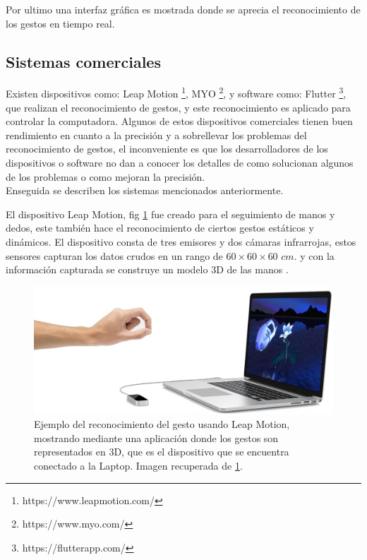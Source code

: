 Por ultimo una interfaz gráfica es mostrada donde se aprecia el reconocimiento de los gestos en tiempo real.  


 
\subsection{Sistemas comerciales}

Existen dispositivos como: Leap Motion \footnote{\label{LeapMotionFN} https://www.leapmotion.com/}, MYO \footnote{\label{MyoFN} https://www.myo.com/}, y software como: Flutter \footnote{\label{FlutterFN} https://flutterapp.com/}, que realizan el reconocimiento de gestos, y este reconocimiento es aplicado para controlar la computadora. Algunos de estos dispositivos comerciales tienen  buen rendimiento en cuanto a la precisión y a sobrellevar los problemas del reconocimiento de gestos, el inconveniente es que los desarrolladores de los dispositivos o software no dan a conocer los detalles de como solucionan algunos de los problemas o como mejoran la precisión. \\ 
Enseguida se describen los sistemas mencionados anteriormente.
 
El dispositivo Leap Motion, fig \ref{fig:LeapMotion} fue creado para el seguimiento de manos y dedos, este también hace el reconocimiento de ciertos gestos estáticos y dinámicos. El dispositivo consta de tres emisores y dos cámaras infrarrojas, estos sensores capturan los datos crudos en un rango de $60 \times 60 \times 60$ $cm.$ y con la información capturada se construye un modelo 3D de las manos \citep{Weichert2013}. 

\begin{figure}[h!]
\begin{center}
\includegraphics[scale=.3]{./Figures/LeapMotion.png}
\end{center}
\caption{Ejemplo del reconocimiento del gesto usando Leap Motion, mostrando mediante una aplicación donde los gestos son representados en 3D, que es el dispositivo que se encuentra conectado a la Laptop. Imagen recuperada de \ref{LeapMotionFN}.}
\label{fig:LeapMotion}
\end{figure}

